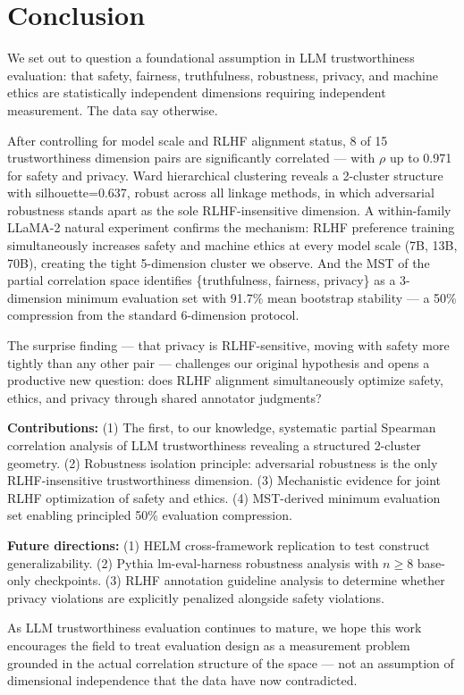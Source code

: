 \section{Conclusion}
\label{sec:conclusion}

We set out to question a foundational assumption in LLM trustworthiness evaluation: that safety, fairness, truthfulness, robustness, privacy, and machine ethics are statistically independent dimensions requiring independent measurement. The data say otherwise.

After controlling for model scale and RLHF alignment status, 8 of 15 trustworthiness dimension pairs are significantly correlated --- with $\rho$ up to 0.971 for safety and privacy. Ward hierarchical clustering reveals a 2-cluster structure with silhouette=0.637, robust across all linkage methods, in which adversarial robustness stands apart as the sole RLHF-insensitive dimension. A within-family LLaMA-2 natural experiment confirms the mechanism: RLHF preference training simultaneously increases safety and machine ethics at every model scale (7B, 13B, 70B), creating the tight 5-dimension cluster we observe. And the MST of the partial correlation space identifies \{truthfulness, fairness, privacy\} as a 3-dimension minimum evaluation set with 91.7\% mean bootstrap stability --- a 50\% compression from the standard 6-dimension protocol.

The surprise finding --- that privacy is RLHF-sensitive, moving with safety more tightly than any other pair --- challenges our original hypothesis and opens a productive new question: does RLHF alignment simultaneously optimize safety, ethics, and privacy through shared annotator judgments?

\textbf{Contributions:} (1) The first, to our knowledge, systematic partial Spearman correlation analysis of LLM trustworthiness revealing a structured 2-cluster geometry. (2) Robustness isolation principle: adversarial robustness is the only RLHF-insensitive trustworthiness dimension. (3) Mechanistic evidence for joint RLHF optimization of safety and ethics. (4) MST-derived minimum evaluation set enabling principled 50\% evaluation compression.

\textbf{Future directions:} (1) HELM cross-framework replication to test construct generalizability. (2) Pythia lm-eval-harness robustness analysis with $n \geq 8$ base-only checkpoints. (3) RLHF annotation guideline analysis to determine whether privacy violations are explicitly penalized alongside safety violations.

As LLM trustworthiness evaluation continues to mature, we hope this work encourages the field to treat evaluation design as a measurement problem grounded in the actual correlation structure of the space --- not an assumption of dimensional independence that the data have now contradicted.
